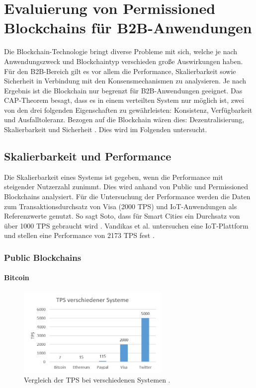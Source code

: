 \chapter{Evaluierung von Permissioned Blockchains für B2B-Anwendungen}
\label{cha:b2b-eval}

Die Blockchain-Technologie bringt diverse Probleme mit sich, welche je nach Anwendungszweck und Blockchaintyp verschieden große Auswirkungen haben. Für den \acs{B2B}-Bereich gilt es vor allem die Performance, Skalierbarkeit sowie Sicherheit in Verbindung mit den Konsensmechanismen zu analysieren. Je nach Ergebnis ist die Blockchain nur begrenzt für \acs{B2B}-Anwendungen geeignet. Das CAP-Theorem besagt, dass es in einem verteilten System nur möglich ist, zwei von den drei folgenden Eigenschaften zu gewährleisten: Konsistenz, Verfügbarkeit und Ausfalltoleranz. Bezogen auf die Blockchain wären dies: Dezentralisierung, Skalierbarkeit und Sicherheit \cite{SchererPerformanceScalabilityBlockchain2017}. Dies wird im Folgenden untersucht.

\section{Skalierbarkeit und Performance}
\label{sec:scalability-eval}
Die Skalierbarkeit eines Systems ist gegeben, wenn die Performance mit steigender Nutzerzahl zunimmt. Dies wird anhand von Public und Permissioned Blockchains analysiert. Für die Untersuchung der Performance werden die Daten zum Transaktionsdurchsatz von Visa (2000 \acs{TPS}) und \acs{IoT}-Anwendungen als Referenzwerte genutzt. So sagt Soto, dass für Smart Cities ein Durchsatz von über 1000 \acs{TPS} gebraucht wird \cite{AraujoSotoPerformanceevaluationscalable2017}. Vandikas et al. untersuchen eine \acs{IoT}-Plattform und stellen eine Performance von 2173 \acs{TPS} fest \cite{VandikasPerformanceEvaluationIoT2014}. 

\subsection{Public Blockchains}


\subsubsection{Bitcoin}

\begin{figure}[!htbp]
  \centering
    \includegraphics[width=0.65\textwidth,angle=0]{images/tps-comparison}
    \caption{Vergleich der \acs{TPS} bei verschiedenen Systemen \cite[S.~28]{SwanBlockchainblueprintnew2015}\cite{BitcoinTeamScalabilityBitcoinWiki}.}
    \label{fig:tps-comparison}
\end{figure} 

